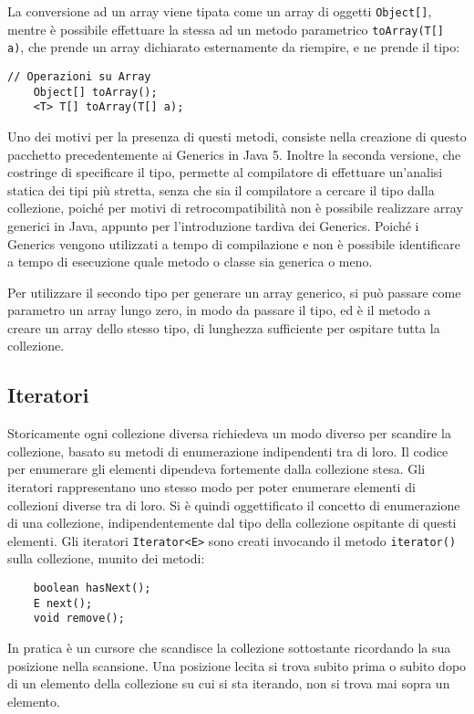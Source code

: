 \documentclass{article}
\numberwithin{equation}{subsection}
\begin{document}
La conversione ad un array viene tipata come un array di oggetti \verb|Object[]|, mentre è possibile effettuare la stessa ad un metodo parametrico \verb|toArray(T[] a)|, che 
prende un array dichiarato esternamente da riempire, e ne prende il tipo:
\begin{verbatim}
// Operazioni su Array
    Object[] toArray();
    <T> T[] toArray(T[] a);
\end{verbatim}
Uno dei motivi per la presenza di questi metodi, consiste nella creazione di questo pacchetto precedentemente ai Generics in Java 5. Inoltre la seconda versione, che costringe di 
specificare il tipo, permette al compilatore di effettuare un'analisi statica dei tipi più stretta, senza che sia il compilatore a cercare il tipo dalla collezione, poiché 
per motivi di retrocompatibilità non è possibile realizzare array generici in Java, appunto per l'introduzione tardiva dei Generics. Poiché i Generics vengono utilizzati a 
tempo di compilazione e non è possibile identificare a tempo di esecuzione quale metodo o classe sia generica o meno. 

Per utilizzare il secondo tipo per generare un array generico, si può passare come parametro un array lungo zero, in modo da passare il tipo, ed è il metodo a creare un array 
dello stesso tipo, di lunghezza sufficiente per ospitare tutta la collezione. 

\subsection{Iteratori}

Storicamente ogni collezione diversa richiedeva un modo diverso per scandire la collezione, basato su metodi di enumerazione indipendenti tra di loro. 
Il codice per enumerare gli elementi dipendeva fortemente dalla collezione stesa. Gli iteratori rappresentano uno stesso modo per poter enumerare elementi di collezioni diverse 
tra di loro. 
Si è quindi oggettificato il concetto di enumerazione di una collezione, indipendentemente dal tipo della collezione ospitante di questi elementi. Gli iteratori \verb|Iterator<E>| 
sono creati invocando il metodo \verb|iterator()| sulla collezione, munito dei metodi:
\begin{verbatim}
    boolean hasNext();
    E next();
    void remove();
\end{verbatim}

In pratica è un cursore che scandisce la collezione sottostante ricordando la sua posizione nella scansione. Una posizione lecita si trova subito prima o subito dopo di un 
elemento della collezione su cui si sta iterando, non si trova mai sopra un elemento. 
\end{document}
